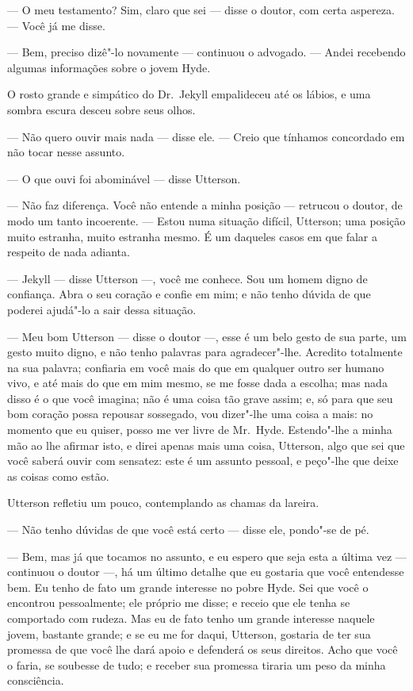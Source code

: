 --- O meu testamento? Sim, claro que sei --- disse o doutor, com certa
aspereza. --- Você já me disse.

--- Bem, preciso dizê"-lo novamente --- continuou o advogado. --- Andei
recebendo algumas informações sobre o jovem Hyde.

O rosto grande e simpático do Dr.~Jekyll empalideceu até os lábios, e
uma sombra escura desceu sobre seus olhos.

--- Não quero ouvir mais nada --- disse ele. --- Creio que tínhamos
concordado em não tocar nesse assunto.

--- O que ouvi foi abominável --- disse Utterson.

--- Não faz diferença. Você não entende a minha posição --- retrucou o
doutor, de modo um tanto incoerente. --- Estou numa situação difícil,
Utterson; uma posição muito estranha, muito estranha mesmo.  É um
daqueles casos em que falar a respeito de nada adianta.

--- Jekyll --- disse Utterson ---, você me conhece.  Sou um homem digno de
confiança.  Abra o seu coração e confie em mim; e não tenho dúvida de
que poderei ajudá"-lo a sair dessa situação.

--- Meu bom Utterson --- disse o doutor ---, esse é um belo gesto de sua
parte, um gesto muito digno, e não tenho palavras para agradecer"-lhe. 
Acredito totalmente na sua palavra; confiaria em você mais do que em
qualquer outro ser humano vivo, e até mais do que em mim mesmo, se me
fosse dada a escolha; mas nada disso é o que você imagina; não é uma
coisa tão grave assim; e, só para que seu bom coração possa repousar
sossegado, vou dizer"-lhe uma coisa a mais: no momento que eu quiser,
posso me ver livre de Mr.~Hyde.  Estendo"-lhe a minha mão ao lhe afirmar
isto, e direi apenas mais uma coisa, Utterson, algo que sei que você
saberá ouvir com sensatez: este é um assunto pessoal, e peço"-lhe que
deixe as coisas como estão.

Utterson refletiu um pouco, contemplando as chamas da lareira.

--- Não tenho dúvidas de que você está certo --- disse ele, pondo"-se de
pé.

--- Bem, mas já que tocamos no assunto, e eu espero que seja esta a
última vez --- continuou o doutor ---, há um último detalhe que eu gostaria
que você entendesse bem.  Eu tenho de fato um grande interesse no pobre
Hyde.  Sei que você o encontrou pessoalmente; ele próprio me disse; e
receio que ele tenha se comportado com rudeza.  Mas eu de fato tenho um
grande interesse naquele jovem, bastante grande; e se eu me for daqui,
Utterson, gostaria de ter sua promessa de que você lhe dará apoio e
defenderá os seus direitos.  Acho que você o faria, se soubesse de
tudo; e receber sua promessa tiraria um peso da minha consciência.

